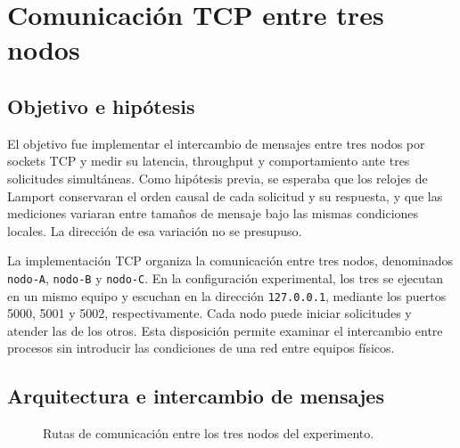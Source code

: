 \section{Comunicación TCP entre tres nodos}
\label{sec:tcp-jordan}

\subsection{Objetivo e hipótesis}

El objetivo fue implementar el intercambio de mensajes entre tres nodos por
sockets TCP y medir su latencia, throughput y comportamiento ante tres
solicitudes simultáneas. Como hipótesis previa, se esperaba que los relojes de
Lamport conservaran el orden causal de cada solicitud y su respuesta, y que
las mediciones variaran entre tamaños de mensaje bajo las mismas condiciones
locales. La dirección de esa variación no se presupuso.

La implementación TCP organiza la comunicación entre tres nodos, denominados
\texttt{nodo-A}, \texttt{nodo-B} y \texttt{nodo-C}. En la configuración
experimental, los tres se ejecutan en un mismo equipo y escuchan en la
dirección \texttt{127.0.0.1}, mediante los puertos 5000, 5001 y 5002,
respectivamente. Cada nodo puede iniciar solicitudes y atender las de los
otros. Esta disposición permite examinar el intercambio entre procesos sin
introducir las condiciones de una red entre equipos físicos.

\subsection{Arquitectura e intercambio de mensajes}

\begin{figure}[htbp]
\centering
{}
\caption{Rutas de comunicación entre los tres nodos del experimento.}
\label{fig:arquitectura-tcp}
\end{figure}

